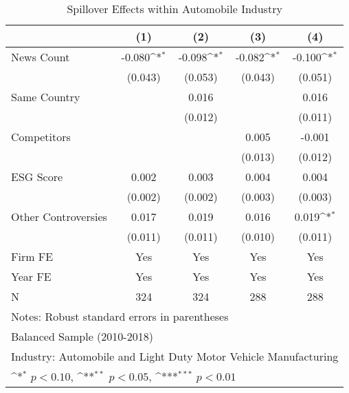 \begin{table}[htbp]\centering
\def\sym#1{\ifmmode^{#1}\else\(^{#1}\)\fi}
\caption{Spillover Effects within Automobile Industry}
\begin{tabular}{l*{4}{c}}
\toprule
                    &\multicolumn{1}{c}{(1)}         &\multicolumn{1}{c}{(2)}         &\multicolumn{1}{c}{(3)}         &\multicolumn{1}{c}{(4)}         \\
\midrule
News Count          &      -0.080\sym{*}  &      -0.098\sym{*}  &      -0.082\sym{*}  &      -0.100\sym{*}  \\
                    &     (0.043)         &     (0.053)         &     (0.043)         &     (0.051)         \\
\addlinespace
Same Country        &                     &       0.016         &                     &       0.016         \\
                    &                     &     (0.012)         &                     &     (0.011)         \\
\addlinespace
Competitors         &                     &                     &       0.005         &      -0.001         \\
                    &                     &                     &     (0.013)         &     (0.012)         \\
\addlinespace
ESG Score           &       0.002         &       0.003         &       0.004         &       0.004         \\
                    &     (0.002)         &     (0.002)         &     (0.003)         &     (0.003)         \\
\addlinespace
Other Controversies &       0.017         &       0.019         &       0.016         &       0.019\sym{*}  \\
                    &     (0.011)         &     (0.011)         &     (0.010)         &     (0.011)         \\
\midrule
Firm FE             &         Yes         &         Yes         &         Yes         &         Yes         \\
Year FE             &         Yes         &         Yes         &         Yes         &         Yes         \\
N                   &         324         &         324         &         288         &         288         \\
\bottomrule
\multicolumn{5}{l}{\footnotesize Notes: Robust standard errors in parentheses}\\
\multicolumn{5}{l}{\footnotesize Balanced Sample (2010-2018)}\\
\multicolumn{5}{l}{\footnotesize Industry: Automobile and Light Duty Motor Vehicle Manufacturing}\\
\multicolumn{5}{l}{\footnotesize \sym{*} \(p<0.10\), \sym{**} \(p<0.05\), \sym{***} \(p<0.01\)}\\
\end{tabular}
\end{table}
